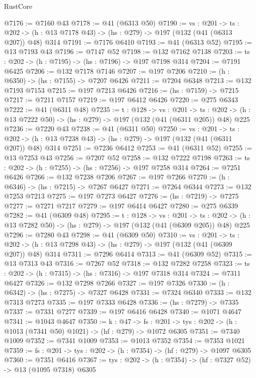 \begin{lexlean}{RustCore}
\begin{coremodule}
@7176 := @7160 @43
@7178 := @41 (@6313 @50)
@7190 := {vs : @201} ->
  {ts : @202} -> (h : @13 @7178 @43) -> (hs : @279) -> @197 (@132 (@41 (@6313 @207)) @48) @314
@7191 := @7176 @6410
@7193 := @41 (@6313 @52)
@7195 := @13 @7193 @43
@7196 := @7147 @52
@7198 := @132 @7162 @7138
@7203 := {ts : @202} -> (h : @7195) -> (hs : @7196) -> @197 @7198 @314
@7204 := @7191 @6425
@7206 := @132 @7178 @7146
@7207 := @197 @7206
@7210 := (h : @6350) -> (hs : @7155) -> @7207 @6426
@7211 := @7204 @6348
@7213 := @132 @7193 @7153
@7215 := @197 @7213 @6426
@7216 := (hs : @7159) -> @7215
@7217 := @7211 @7157
@7219 := @197 @6412 @6426
@7220 := @275 @6343
@7222 := @41 (@6311 @48)
@7235 := {t : @128} ->
  {vs : @201} ->
  {ts : @202} -> (h : @13 @7222 @50) -> (hs : @279) -> @197 (@132 (@41 (@6311 @205)) @48) @225
@7236 := @7220 @43
@7238 := @41 (@6311 @50)
@7250 := {vs : @201} ->
  {ts : @202} -> (h : @13 @7238 @43) -> (hs : @279) -> @197 (@132 (@41 (@6311 @207)) @48) @314
@7251 := @7236 @6412
@7253 := @41 (@6311 @52)
@7255 := @13 @7253 @43
@7256 := @7207 @52
@7258 := @132 @7222 @7198
@7263 := {ts : @202} -> (h : @7255) -> (hs : @7256) -> @197 @7258 @314
@7264 := @7251 @6426
@7266 := @132 @7238 @7206
@7267 := @197 @7266
@7270 := (h : @6346) -> (hs : @7215) -> @7267 @6427
@7271 := @7264 @6344
@7273 := @132 @7253 @7213
@7275 := @197 @7273 @6427
@7276 := (hs : @7219) -> @7275
@7277 := @7271 @7217
@7279 := @197 @6414 @6427
@7280 := @275 @6339
@7282 := @41 (@6309 @48)
@7295 := {t : @128} ->
  {vs : @201} ->
  {ts : @202} -> (h : @13 @7282 @50) -> (hs : @279) -> @197 (@132 (@41 (@6309 @205)) @48) @225
@7296 := @7280 @43
@7298 := @41 (@6309 @50)
@7310 := {vs : @201} ->
  {ts : @202} -> (h : @13 @7298 @43) -> (hs : @279) -> @197 (@132 (@41 (@6309 @207)) @48) @314
@7311 := @7296 @6414
@7313 := @41 (@6309 @52)
@7315 := @13 @7313 @43
@7316 := @7267 @52
@7318 := @132 @7282 @7258
@7323 := {ts : @202} -> (h : @7315) -> (hs : @7316) -> @197 @7318 @314
@7324 := @7311 @6427
@7326 := @132 @7298 @7266
@7327 := @197 @7326
@7330 := (h : @6342) -> (hs : @7275) -> @7327 @6428
@7331 := @7324 @6340
@7333 := @132 @7313 @7273
@7335 := @197 @7333 @6428
@7336 := (hs : @7279) -> @7335
@7337 := @7331 @7277
@7339 := @197 @6416 @6428
@7340 := @1071 @4647
@7341 := @1043 @4647
@7350 := {k : @47} ->
  {fs : @201} -> {tys : @202} -> (h : @1013 (@7341 @50) @1021) -> (hf : @279) -> @1072 @6305
@7351 := @7340 @1009
@7352 := @7341 @1009
@7353 := @1013 @7352
@7354 := @7353 @1021
@7359 := {fs : @201} -> {tys : @202} -> (h : @7354) -> (hf : @279) -> @1097 @6305
@7360 := @7351 @6416
@7367 := {tys : @202} -> (h : @7354) -> (hf : @7327 @52) -> @13 (@1095 @7318) @6305

\end{coremodule}
\end{lexlean}
